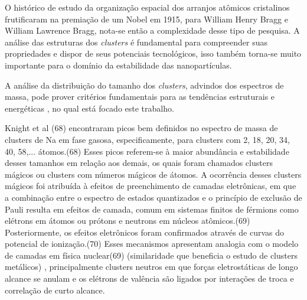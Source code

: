 O histórico de estudo da organização espacial dos arranjos atômicos cristalinos frutificaram na premiação de um Nobel em 1915, para William Henry Bragg e William Lawrence Bragg, nota-se então a complexidade desse tipo de pesquisa. A análise das estruturas dos \textit{clusters} é fundamental para compreender suas propriedades e  dispor de seus potenciais tecnológicos, isso também torna-se muito importante para o domínio da estabilidade das nanopartículas. 

A análise da distribuição do tamanho dos \textit{clusters}, advindos dos espectros
de massa, pode prover critérios fundamentais para as tendências estruturais e energéticas \cite{dissertacao_anderson}, no qual está focado este trabalho.

Knight et al (68) encontraram picos bem definidos no espectro de massa de
clusters de Na em fase gasosa, especificamente, para clusters com 2, 18, 20, 34, 40, 58,...
átomos.(68) Esses picos referem-se à maior abundância e estabilidade desses tamanhos em
relação aos demais, os quais foram chamados clusters mágicos ou clusters com números
mágicos de átomos. A ocorrência desses clusters mágicos foi atribuída à efeitos de
preenchimento de camadas eletrônicas, em que a combinação entre o espectro de estados
quantizados e o princípio de exclusão de Pauli resulta em efeitos de camada, comum em
sistemas finitos de férmions como elétrons em átomos ou prótons e neutrons em núcleos
atômicos.(69) Posteriormente, os efeitos eletrônicos foram confirmados através de curvas
do potencial de ionização.(70) Esses mecanismos apresentam analogia com o modelo de
camadas em física nuclear(69) (similaridade que beneficia o estudo de clusters metálicos)
, principalmente clusters neutros em que forças eletrostáticas de longo alcance se anulam e
os elétrons de valência são ligados por interações de troca e correlação de curto alcance.



